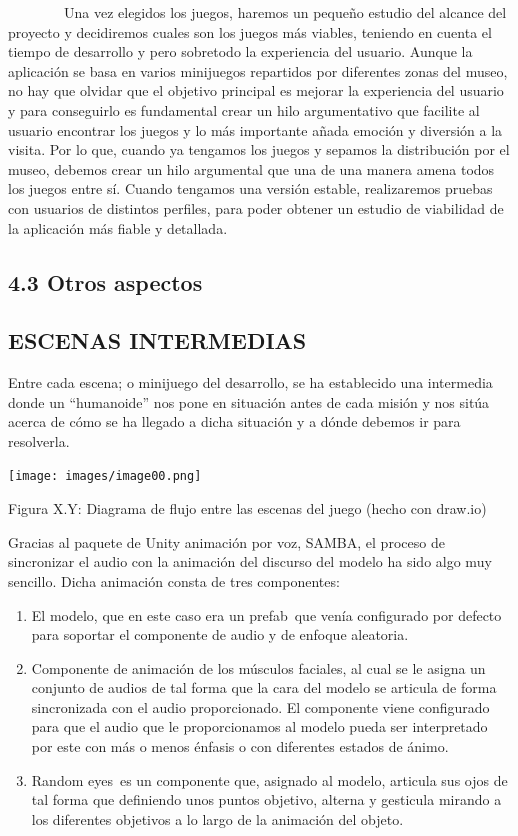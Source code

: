 \documentclass[]{article}
\begin{document}
~~~~~~~~Una vez elegidos los juegos, haremos un pequeño estudio del
alcance del proyecto y decidiremos cuales son los juegos más viables,
teniendo en cuenta el tiempo de desarrollo y pero sobretodo la
experiencia del usuario. Aunque la aplicación se basa en varios
minijuegos repartidos por diferentes zonas del museo, no hay que olvidar
que el objetivo principal es mejorar la experiencia del usuario y para
conseguirlo es fundamental crear un hilo argumentativo que facilite al
usuario encontrar los juegos y lo más importante añada emoción y
diversión a la visita. Por lo que, cuando ya tengamos los juegos y
sepamos la distribución por el museo, debemos crear un hilo argumental
que una de una manera amena todos los juegos entre sí. Cuando tengamos
una versión estable, realizaremos pruebas con usuarios de distintos
perfiles, para poder obtener un estudio de viabilidad de la aplicación
más fiable y detallada.

\subsection{4.3 Otros aspectos}\label{h.yyppnqmy8a9a}

\subsection{ESCENAS INTERMEDIAS}\label{h.hulp4wa8ygn2}

Entre cada escena; o minijuego del desarrollo, se ha establecido una
intermedia donde un ``humanoide'' nos pone en situación antes de cada
misión y nos sitúa acerca de cómo se ha llegado a dicha situación y a
dónde debemos ir para resolverla.

\texttt{[image: images/image00.png]}

Figura X.Y: Diagrama de flujo entre las escenas del juego (hecho con
draw.io)

Gracias al paquete de Unity animación por voz, SAMBA, el proceso de
sincronizar el audio con la animación del discurso del modelo ha sido
algo muy sencillo. Dicha animación consta de tres componentes:

\begin{enumerate}
\itemsep1pt\parskip0pt
\item
  El modelo, que en este caso era un prefab~que venía configurado por
  defecto para soportar el componente de audio y de enfoque aleatoria.
\item
  Componente de animación de los músculos faciales, al cual se le asigna
  un conjunto de audios de tal forma que la cara del modelo se articula
  de forma sincronizada con el audio proporcionado. El componente viene
  configurado para que el audio que le proporcionamos al modelo pueda
  ser interpretado por este con más o menos énfasis o con diferentes
  estados de ánimo.
\item
  Random eyes~es un componente que, asignado al modelo, articula sus
  ojos de tal forma que definiendo unos puntos objetivo, alterna y
  gesticula mirando a los diferentes objetivos a lo largo de la
  animación del objeto.
\end{enumerate}
\end{document}
